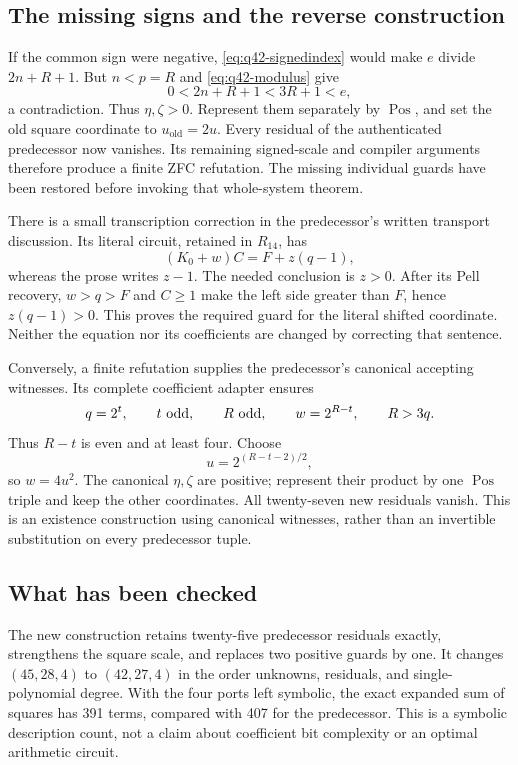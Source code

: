 \subsection{The missing signs and the reverse construction}

If the common sign were negative, \eqref{eq:q42-signedindex} would make
$e$ divide $2n+R+1$. But $n<p=R$ and \eqref{eq:q42-modulus} give
\[
 0<2n+R+1<3R+1<e,
\]
a contradiction. Thus $\eta,\zeta>0$. Represent them separately by
$\operatorname{Pos}$, and set the old square coordinate to
$u_{\mathrm{old}}=2u$. Every residual of the authenticated predecessor
now vanishes. Its remaining signed-scale and compiler arguments therefore
produce a finite ZFC refutation. The missing individual guards have been
restored before invoking that whole-system theorem.

There is a small transcription correction in the predecessor's written
transport discussion. Its literal circuit, retained in $R_{14}$, has
\[
 (K_0+w)C=F+z(q-1),
\]
whereas the prose writes $z-1$. The needed conclusion is $z>0$.
After its Pell recovery, $w>q>F$ and $C\ge1$ make the left side greater
than $F$, hence $z(q-1)>0$. This proves the required guard for the
literal shifted coordinate. Neither the equation nor its coefficients
are changed by correcting that sentence.

Conversely, a finite refutation supplies the predecessor's canonical
accepting witnesses. Its complete coefficient adapter ensures
\[
 q=2^t,\qquad t\ \hbox{odd},\qquad R\ \hbox{odd},
 \qquad w=2^{R-t},\qquad R>3q.
\]
Thus $R-t$ is even and at least four. Choose
\[
 u=2^{(R-t-2)/2},
\]
so $w=4u^2$. The canonical $\eta,\zeta$ are positive; represent their
product by one $\operatorname{Pos}$ triple and keep the other coordinates.
All twenty-seven new residuals vanish. This is an existence construction
using canonical witnesses, rather than an invertible substitution on
every predecessor tuple.

\subsection{What has been checked}

The new construction retains twenty-five predecessor residuals exactly,
strengthens the square scale, and replaces two positive guards by one.
It changes $(45,28,4)$ to $(42,27,4)$ in the order
unknowns, residuals, and single-polynomial degree.
With the four ports left symbolic, the exact expanded sum of squares
has 391 terms, compared with 407 for the predecessor. This is a symbolic
description count, not a claim about coefficient bit complexity or an
optimal arithmetic circuit.


